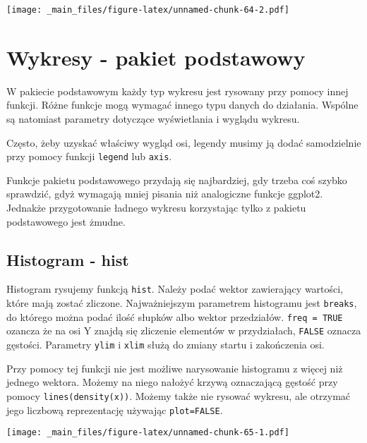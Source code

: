 \documentclass[
]{book}
\newenvironment{Shaded}{\begin{snugshade}}{\end{snugshade}}
\newcommand{\FunctionTok}[1]{\textcolor[rgb]{0.00,0.00,0.00}{#1}}
\newcommand{\NormalTok}[1]{#1}
\newcommand{\SpecialCharTok}[1]{\textcolor[rgb]{0.00,0.00,0.00}{#1}}
\begin{document}
\texttt{[image: \_main\_files/figure-latex/unnamed-chunk-64-2.pdf]}

\hypertarget{wykresy---pakiet-podstawowy}{%
\chapter{Wykresy - pakiet podstawowy}\label{wykresy---pakiet-podstawowy}}

W pakiecie podstawowym każdy typ wykresu jest rysowany przy pomocy innej funkcji. Różne funkcje mogą wymagać innego typu danych do działania. Wspólne są natomiast parametry dotyczące wyświetlania i wyglądu wykresu.

Często, żeby uzyskać właściwy wygląd osi, legendy musimy ją dodać samodzielnie przy pomocy funkcji \texttt{legend} lub \texttt{axis}.

Funkcje pakietu podstawowego przydają się najbardziej, gdy trzeba coś szybko sprawdzić, gdyż wymagają mniej pisania niż analogiczne funkcje ggplot2. Jednakże przygotowanie ładnego wykresu korzystając tylko z pakietu podstawowego jest żmudne.

\hypertarget{histogram---hist}{%
\section{Histogram - hist}\label{histogram---hist}}

Histogram rysujemy funkcją \texttt{hist}. Należy podać wektor zawierający wartości, które mają zostać zliczone. Najważniejszym parametrem histogramu jest \texttt{breaks}, do którego można podać ilość słupków albo wektor przedziałów. \texttt{freq\ =\ TRUE} ozancza że na osi Y znajdą się zliczenie elementów w przydziałach, \texttt{FALSE} oznacza gęstości. Parametry \texttt{ylim} i \texttt{xlim} służą do zmiany startu i zakończenia osi.

Przy pomocy tej funkcji nie jest możliwe narysowanie histogramu z więcej niż jednego wektora. Możemy na niego nałożyć krzywą oznaczającą gęstość przy pomocy \texttt{lines(density(x))}. Możemy także nie rysować wykresu, ale otrzymać jego liczbową reprezentację używając \texttt{plot=FALSE}.

\begin{Shaded}
\end{Shaded}

\texttt{[image: \_main\_files/figure-latex/unnamed-chunk-65-1.pdf]}
\end{document}
